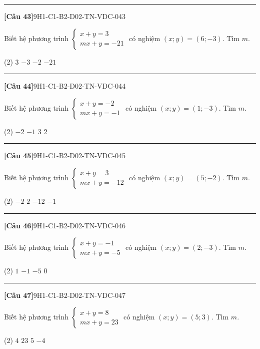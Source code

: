 \documentclass[12pt,a4paper]{article}
\newif\ifloigiai
\newenvironment{cauhoi}[2]{%
  \par\medskip\noindent\rule{\textwidth}{0.4pt}\par\nopagebreak
  \noindent\textbf{[#1]}\hfill{\scriptsize\ttfamily #2}\par\nopagebreak\smallskip}{\par}
\newcommand{\dapan}[1]{\ifloigiai\par\smallskip\noindent\textit{Đáp án:} \textbf{#1}\par\fi}
\begin{document}
\begin{cauhoi}{Câu 43}{9H1-C1-B2-D02-TN-VDC-043}
Biết hệ phương trình $\begin{cases}x+y=3\\ mx+y=-21\end{cases}$ có nghiệm $(x;y)=(6;-3)$. Tìm $m$.
\begin{tasks}(2)
\task $3$
\task $-3$
\task $-2$
\task $-21$
\end{tasks}
\dapan{B}
\end{cauhoi}
\begin{cauhoi}{Câu 44}{9H1-C1-B2-D02-TN-VDC-044}
Biết hệ phương trình $\begin{cases}x+y=-2\\ mx+y=-1\end{cases}$ có nghiệm $(x;y)=(1;-3)$. Tìm $m$.
\begin{tasks}(2)
\task $-2$
\task $-1$
\task $3$
\task $2$
\end{tasks}
\dapan{D}
\end{cauhoi}
\begin{cauhoi}{Câu 45}{9H1-C1-B2-D02-TN-VDC-045}
Biết hệ phương trình $\begin{cases}x+y=3\\ mx+y=-12\end{cases}$ có nghiệm $(x;y)=(5;-2)$. Tìm $m$.
\begin{tasks}(2)
\task $-2$
\task $2$
\task $-12$
\task $-1$
\end{tasks}
\dapan{A}
\end{cauhoi}
\begin{cauhoi}{Câu 46}{9H1-C1-B2-D02-TN-VDC-046}
Biết hệ phương trình $\begin{cases}x+y=-1\\ mx+y=-5\end{cases}$ có nghiệm $(x;y)=(2;-3)$. Tìm $m$.
\begin{tasks}(2)
\task $1$
\task $-1$
\task $-5$
\task $0$
\end{tasks}
\dapan{B}
\end{cauhoi}
\begin{cauhoi}{Câu 47}{9H1-C1-B2-D02-TN-VDC-047}
Biết hệ phương trình $\begin{cases}x+y=8\\ mx+y=23\end{cases}$ có nghiệm $(x;y)=(5;3)$. Tìm $m$.
\begin{tasks}(2)
\task $4$
\task $23$
\task $5$
\task $-4$
\end{tasks}
\dapan{A}
\end{cauhoi}
\end{document}
